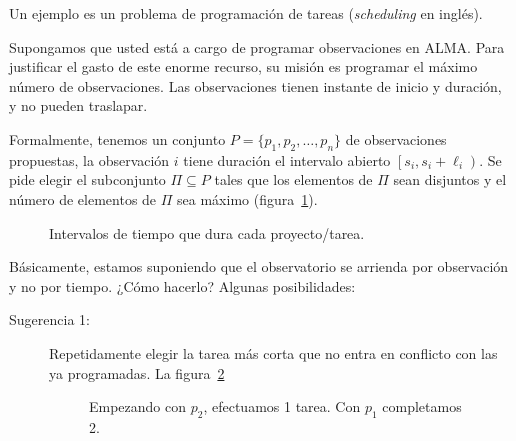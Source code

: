   Un ejemplo es un problema de programación de tareas
  (\emph{\foreignlanguage{english}{scheduling}} en inglés).
  \begin{example}
    \label{07::EjemploAlma}
    Supongamos que usted está a cargo de programar observaciones en ALMA.
    Para justificar el gasto de este enorme recurso,
    su misión es programar el máximo número de observaciones.
    Las observaciones tienen instante de inicio y duración,
    y no pueden traslapar.

    Formalmente,
    tenemos un conjunto \(P = \{p_1, p_2, \ldots, p_n\}\)
    de observaciones propuestas,
    la observación \(i\) tiene duración
    el intervalo abierto \(\left[ s_i, s_i+\ell _i \right)\).
    Se pide elegir el subconjunto \(\Pi \subseteq P\)
    tales que los elementos de \(\Pi\) sean disjuntos
    y el número de elementos de \(\Pi\) sea máximo
    (figura~\ref{07::Tareas1}).
    \newcommand{\lineaTarea}[4]{ %
                  \draw (#1, 0.15+#2) -- (#1, -0.15+#2) -- (#1, #2)
                          -- (#1+#3, #2) -- (#1+#3, 0.15+#2)
                          -- (#1+#3, -0.15+#2);
                  \node at (#1 - 0.3, #2) () {\(#4\)};
               }
    \begin{figure}[ht]
      \centering
      \caption{Intervalos de tiempo que dura cada proyecto/tarea.}
      \label{07::Tareas1}
    \end{figure}
    Básicamente,
    estamos suponiendo que el observatorio
    se arrienda por observación y no por tiempo.
    ¿Cómo hacerlo?
    Algunas posibilidades:
    \begin{description}
    \item[Sugerencia 1:]
      Repetidamente elegir la tarea más corta
      que no entra en conflicto con las ya programadas.
      La figura~\ref{07::Tareas2}
      \begin{figure}[ht]
        \centering
        \caption{Empezando con \(p_2\),
                 efectuamos \num{1} tarea.
                 Con \(p_1\) completamos \num{2}.}
        \label{07::Tareas2}

\end{figure}
\end{description}
\end{example}
